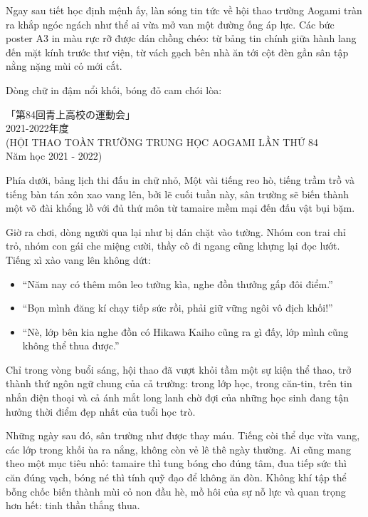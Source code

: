 \documentclass[../main.tex]{subfiles}
\begin{document}
\il

\ct

Ngay sau tiết học định mệnh ấy, làn sóng tin tức về hội thao trường Aogami tràn ra khắp ngóc ngách như thể ai vừa mở van một đường ống áp lực. Các bức poster A3 in màu rực rỡ được dán chồng chéo: từ bảng tin chính giữa hành lang đến mặt kính trước thư viện, từ vách gạch bên nhà ăn tới cột đèn gần sân tập nằng nặng mùi cỏ mới cắt.

Dòng chữ in đậm nổi khối, bóng đỏ cam chói lòa:

\begin{center}
  \Large{「第84回青上高校の運動会」\\2021-2022年度\\(HỘI THAO TOÀN TRƯỜNG TRUNG HỌC AOGAMI LẦN THỨ 84\\Năm học 2021 - 2022)}
\end{center}

Phía dưới, bảng lịch thi đấu in chữ nhỏ, Một vài tiếng reo hò, tiếng trầm trồ và tiếng bàn tán xôn xao vang lên, bởi lẽ cuối tuần này, sân trường sẽ biến thành một võ đài khổng lồ với đủ thứ môn từ tamaire mềm mại đến đấu vật bụi bặm.

Giờ ra chơi, dòng người qua lại như bị dán chặt vào tường. Nhóm con trai chỉ trỏ, nhóm con gái che miệng cười, thầy cô đi ngang cũng khựng lại đọc lướt. Tiếng xì xào vang lên không dứt:

\begin{itemize}
  \item ``Năm nay có thêm môn leo tường kìa, nghe đồn thưởng gấp đôi điểm.''
  \item ``Bọn mình đăng kí chạy tiếp sức rồi, phải giữ vững ngôi vô địch khối!''
  \item ``Nè, lớp bên kia nghe đồn có Hikawa Kaiho cũng ra gì đấy, lớp mình cũng không thể thua được.''
\end{itemize}

Chỉ trong vòng buổi sáng, hội thao đã vượt khỏi tầm một sự kiện thể thao, trở thành thứ ngôn ngữ chung của cả trường: trong lớp học, trong căn-tin, trên tin nhắn điện thoại và cả ánh mắt long lanh chờ đợi của những học sinh đang tận hưởng thời điểm đẹp nhất của tuổi học trò.

Những ngày sau đó, sân trường như được thay máu. Tiếng còi thể dục vừa vang, các lớp trong khối ùa ra nắng, không còn vẻ lê thê ngày thường. Ai cũng mang theo một mục tiêu nhỏ: tamaire thì tung bóng cho đúng tâm, đua tiếp sức thì căn đúng vạch, bóng né thì tính quỹ đạo để không ăn đòn. Không khí tập thể bỗng chốc biến thành mùi cỏ non đầu hè, mồ hôi của sự nỗ lực và quan trọng hơn hết: tinh thần thắng thua.
\end{document}

